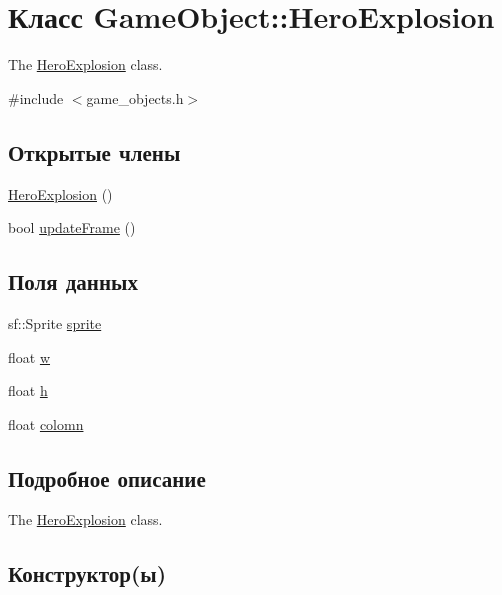 \hypertarget{classGameObject_1_1HeroExplosion}{}\section{Класс Game\+Object\+:\+:Hero\+Explosion}
\label{classGameObject_1_1HeroExplosion}


The \hyperlink{classGameObject_1_1HeroExplosion}{Hero\+Explosion} class.  




{\ttfamily \#include $<$game\+\_\+objects.\+h$>$}

\subsection*{Открытые члены}
\begin{DoxyCompactItemize}
\item 
\hyperlink{classGameObject_1_1HeroExplosion_a6bbe6fd284863bcf70b0e4447d8f46c1}{Hero\+Explosion} ()
\item 
bool \hyperlink{classGameObject_1_1HeroExplosion_ac5fa2bfc1bdd8179ad5f113d81e19252}{update\+Frame} ()
\end{DoxyCompactItemize}
\subsection*{Поля данных}
\begin{DoxyCompactItemize}
\item 
sf\+::\+Sprite \hyperlink{classGameObject_1_1HeroExplosion_a6d55438bf1ecf9ced768fa677ebe646d}{sprite}
\item 
float \hyperlink{classGameObject_1_1HeroExplosion_afdb47a4793449f3f75d657535ea6be2c}{w}
\item 
float \hyperlink{classGameObject_1_1HeroExplosion_a3934725c63657743d0ee6d08030a36a1}{h}
\item 
float \hyperlink{classGameObject_1_1HeroExplosion_a9484619a70aa340b7960984067053225}{colomn}
\end{DoxyCompactItemize}


\subsection{Подробное описание}
The \hyperlink{classGameObject_1_1HeroExplosion}{Hero\+Explosion} class. 

\subsection{Конструктор(ы)}
